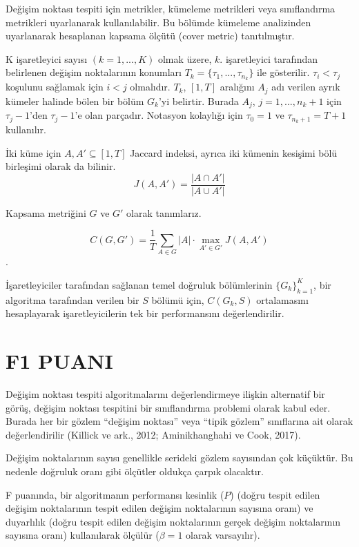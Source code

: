 \documentclass[12pt,twoside]{deuthesis}
\begin{document}
Değişim noktası tespiti için metrikler, kümeleme metrikleri veya sınıflandırma metrikleri uyarlanarak kullanılabilir. Bu bölümde kümeleme analizinden uyarlanarak hesaplanan kapsama ölçütü (cover metric) tanıtılmıştır.

K işaretleyici sayısı \((k=1,...,K)\) olmak üzere, \(k.\) işaretleyici tarafından belirlenen değişim noktalarının konumları \(T_k = \{\tau_1,...,\tau_{n_k}\}\) ile gösterilir. \(\tau_i < \tau_j\) koşulunu sağlamak için \(i < j\) olmalıdır. \(T_k\), \([1, T]\) aralığını \(A_j\) adı verilen ayrık kümeler halinde bölen bir bölüm \(G_k\)'yi belirtir. Burada \(A_j\), \(j = 1,...,n_k +1\) için \(\tau_{j} -1\)'den \(\tau_{j} -1\)'e olan parçadır. Notasyon kolaylığı için \(\tau_0 = 1\) ve \(\tau_{n_k+1} = T +1\) kullanılır.

İki küme için \(A, A' \subseteq [1, T ]\) Jaccard indeksi, ayrıca iki kümenin kesişimi bölü birleşimi olarak da bilinir. \[J(A,A')=\frac{|A\cap A'|}{|A\cup A'|}\]

Kapsama metriğini \(G\) ve \(G'\) olarak tanımlarız.

\[C(G,G') = \frac{1}{T} \sum_{A \in G} |A| \cdot \max_{A' \in G'} J(A,A')\].

İşaretleyiciler tarafından sağlanan temel doğruluk bölümlerinin \(\{G_k\}_{k=1}^K\), bir algoritma tarafından verilen bir \(S\) bölümü için, \(C(G_k,S)\) ortalamasını hesaplayarak işaretleyicilerin tek bir performansını değerlendirilir.

\hypertarget{f1-puani}{%
\section{F1 PUANI}\label{f1-puani}}

Değişim noktası tespiti algoritmalarını değerlendirmeye ilişkin alternatif bir görüş, değişim noktası tespitini bir sınıflandırma problemi olarak kabul eder. Burada her bir gözlem ``değişim noktası'' veya ``tipik gözlem'' sınıflarına ait olarak değerlendirilir (Killick ve ark., 2012; Aminikhanghahi ve Cook, 2017).

Değişim noktalarının sayısı genellikle serideki gözlem sayısından çok küçüktür. Bu nedenle doğruluk oranı gibi ölçütler oldukça çarpık olacaktır.

F puanında, bir algoritmanın performansı kesinlik (\(P\)) (doğru tespit edilen değişim noktalarının tespit edilen değişim noktalarının sayısına oranı) ve duyarlılık (doğru tespit edilen değişim noktalarının gerçek değişim noktalarının sayısına oranı) kullanılarak ölçülür (\(\beta = 1\) olarak varsayılır).
\end{document}
